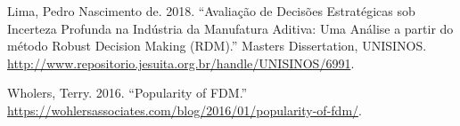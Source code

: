 \documentclass[12pt,ignorenonframetext,]{beamer}
\begin{document}
\hypertarget{ref-Lima2018}{}
Lima, Pedro Nascimento de. 2018. ``Avaliação de Decisões Estratégicas
sob Incerteza Profunda na Indústria da Manufatura Aditiva: Uma Análise a
partir do método Robust Decision Making (RDM).'' Masters Dissertation,
UNISINOS.
\url{http://www.repositorio.jesuita.org.br/handle/UNISINOS/6991}.

\hypertarget{ref-Wholers2016}{}
Wholers, Terry. 2016. ``Popularity of FDM.''
\url{https://wohlersassociates.com/blog/2016/01/popularity-of-fdm/}.
\end{document}
